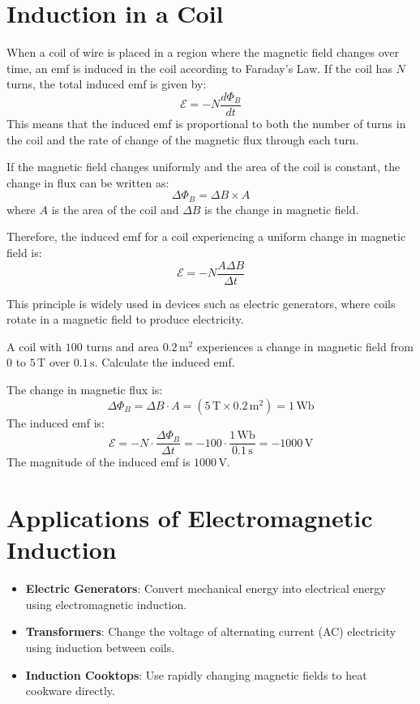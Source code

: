 \section{Induction in a Coil}
When a coil of wire is placed in a region where the magnetic field changes over time, an emf is induced in the coil according to Faraday's Law. If the coil has $N$ turns, the total induced emf is given by:
\[
\mathcal{E} = -N \frac{d\Phi_B}{dt}
\]  
This means that the induced emf is proportional to both the number of turns in the coil and the rate of change of the magnetic flux through each turn.

If the magnetic field changes uniformly and the area of the coil is constant, the change in flux can be written as:
\[
\Delta \Phi_B = \Delta B \times A
\]
where $A$ is the area of the coil and $\Delta B$ is the change in magnetic field.

Therefore, the induced emf for a coil experiencing a uniform change in magnetic field is:
\[  
\mathcal{E} = -N \frac{A \Delta B }{\Delta t}
\]

This principle is widely used in devices such as electric generators, where coils rotate in a magnetic field to produce electricity.

\begin{Exercise}[title={Induced EMF in a Coil}, label=induced_emf_coil]
A coil with $100$ turns and area $0.2\,\mathrm{m}^2$ experiences a change in magnetic field from $0$ to $5\,\mathrm{T}$ over $0.1\,\mathrm{s}$. Calculate the induced emf.
\end{Exercise}
\begin{Answer}[ref=induced_emf_coil]
The change in magnetic flux is:
\[
\Delta \Phi_B = \Delta B \cdot A = (5\,\mathrm{T} \times 0.2\,\mathrm{m}^2) = 1\,\mathrm{Wb}
\]
The induced emf is:
\[
\mathcal{E} = -N \cdot \frac{\Delta \Phi_B}{\Delta t} = -100 \cdot \frac{1\,\mathrm{Wb}}{0.1\,\mathrm{s}} = -1000\,\mathrm{V}
\]
The magnitude of the induced emf is $1000\,\mathrm{V}$.
\end{Answer}

\section{Applications of Electromagnetic Induction}
\begin{itemize}
    \item \textbf{Electric Generators}: Convert mechanical energy into electrical energy using electromagnetic induction.
    \item \textbf{Transformers}: Change the voltage of alternating current (AC) electricity using induction between coils.
    \item \textbf{Induction Cooktops}: Use rapidly changing magnetic fields to heat cookware directly.
\end{itemize}


